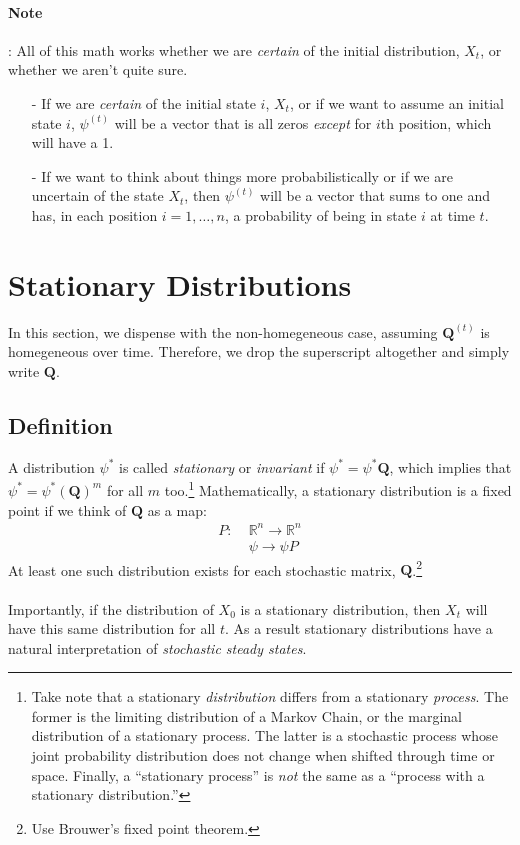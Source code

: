 \documentclass[a4paper,12pt]{scrartcl}
\begin{document}
\paragraph{Note}: All of this math works whether we are 
\emph{certain} of the initial distribution, $X_t$, or
whether we aren't quite sure.  
\begin{itemize}
    \item[-] If we are \emph{certain} of the initial state $i$, 
	$X_t$, or if we want to assume an initial state $i$,
	$\psi^{(t)}$ will be a vector that is all zeros
	\emph{except} for $i$th position, which will have a 1.
    \item[-] If we want to think about things more probabilistically
	or if we are uncertain of the state $X_t$, then
	$\psi^{(t)}$ will be a vector that sums to one and
	has, in each position $i=1,\ldots, n$, a probability
	of being in state $i$ at time $t$.
\end{itemize}


\newpage
\section{Stationary Distributions}

In this section, we dispense with the non-homegeneous
case, assuming $\mathbf{Q}^{(t)}$ is homegeneous
over time. Therefore, we drop the superscript altogether
and simply write $\mathbf{Q}$.

\subsection{Definition}

A distribution $\psi^*$ is called {\sl stationary} or 
{\sl invariant} if $\psi^* = \psi^* \mathbf{Q}$,
which implies that $\psi^* = \psi^* \left(\mathbf{Q}\right)^m$
for all $m$ too.\footnote{Take note that a stationary 
    \emph{distribution} differs from a stationary \emph{process}.
    The former is the limiting distribution of a Markov Chain,
    or the marginal distribution of a stationary process. The
    latter is a stochastic process whose joint probability 
    distribution does not change when shifted through time or
    space.  Finally, a ``stationary process'' is \emph{not} the
    same as a ``process with a stationary distribution.''}
Mathematically, a stationary distribution
is a fixed point if we think of $\mathbf{Q}$ as a map:
\begin{align*}
    P: \; &\mathbb{R}^n \rightarrow \mathbb{R}^n \\
    &\psi \rightarrow \psi P
\end{align*}
At least one such distribution exists for each stochastic
matrix, $\mathbf{Q}$.\footnote{Use Brouwer's fixed point theorem.}
\\
\\
Importantly, if the distribution of $X_0$ is a stationary distribution,
then $X_t$ will have this same distribution for all $t$.
As a result stationary distributions have a natural
interpretation of \emph{stochastic steady states}.
\end{document}
